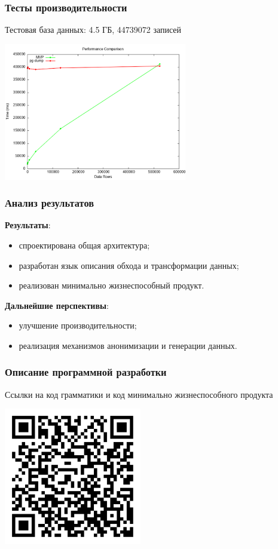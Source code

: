 \documentclass[pdf, hyperref={unicode}, aspectratio=169]{beamer}
\begin{document}
\begin{frame}
\frametitle{Тесты производительности}
	Тестовая база данных: 4.5 ГБ, 44739072 записей

	\begin{center}
		\includegraphics[height = 6cm]{img/benchmark}
	\end{center}
\end{frame}


\begin{frame}
\frametitle{Анализ результатов}
	\textbf{Результаты}:

	\begin{itemize}
		\item спроектирована общая архитектура;
		\item разработан язык описания обхода и трансформации данных;
		\item реализован минимально жизнеспособный продукт.
	\end{itemize}

	\textbf{Дальнейшие перспективы}:
	\begin{itemize}
		\item улучшение производительности;
		\item реализация механизмов анонимизации и генерации данных.
	\end{itemize}

\end{frame}


\begin{frame}
\frametitle{Описание программной разработки}
	Ссылки на код грамматики и код минимально жизнеспособного продукта

	\begin{center}
		\includegraphics[height = 6cm]{img/qr-code-relatio-lang}
	\end{center}
\end{frame}
\end{document}
